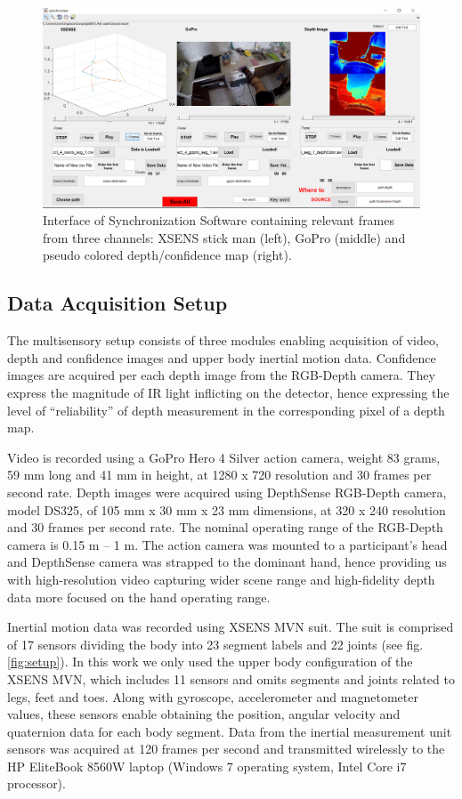 \documentclass[journal]{IEEEtran}
\begin{document}
\begin{figure}[b]
\includegraphics[scale=0.26]{Synchronizer}
\caption{Interface of Synchronization Software containing relevant frames from three channels: XSENS stick man (left), GoPro (middle) and pseudo colored depth/confidence map (right).}
\label{fig:synchronizer}
\centering
\end{figure}

\subsection{Data Acquisition Setup}
	
The multisensory setup consists of three modules enabling acquisition of video, depth and confidence images and upper body inertial motion data. Confidence images are acquired per each depth image from the RGB-Depth camera. They express the magnitude of IR light inflicting on the detector, hence expressing the level of “reliability” of depth measurement in the corresponding pixel of a depth map. 

Video is recorded using a GoPro Hero 4 Silver action camera, weight 83 grams, 59 mm long and 41 mm in height, at 1280 x 720 resolution and 30 frames per second rate. Depth images were acquired using DepthSense RGB-Depth camera, model DS325, of 105 mm x 30 mm x 23 mm dimensions, at 320 x 240 resolution and 30 frames per second rate. The nominal operating range of the RGB-Depth camera is 0.15 m – 1 m. The action camera was mounted to a participant’s head and DepthSense camera was strapped to the dominant hand, hence providing us with high-resolution video capturing wider scene range and high-fidelity depth data more focused on the hand operating range. 

Inertial motion data was recorded using XSENS MVN suit. The suit is comprised of 17 sensors dividing the body into 23 segment labels and 22 joints (see fig. \ref{fig:setup}). In this work we only used the upper body configuration of the XSENS MVN, which includes 11 sensors and omits segments and joints related to legs, feet and toes. Along with gyroscope, accelerometer and magnetometer values, these sensors enable obtaining the position, angular velocity and quaternion data for each body segment. Data from the inertial measurement unit sensors was acquired at 120 frames per second and transmitted wirelessly to the HP EliteBook 8560W laptop (Windows 7 operating system, Intel Core i7 processor). 
\end{document}
